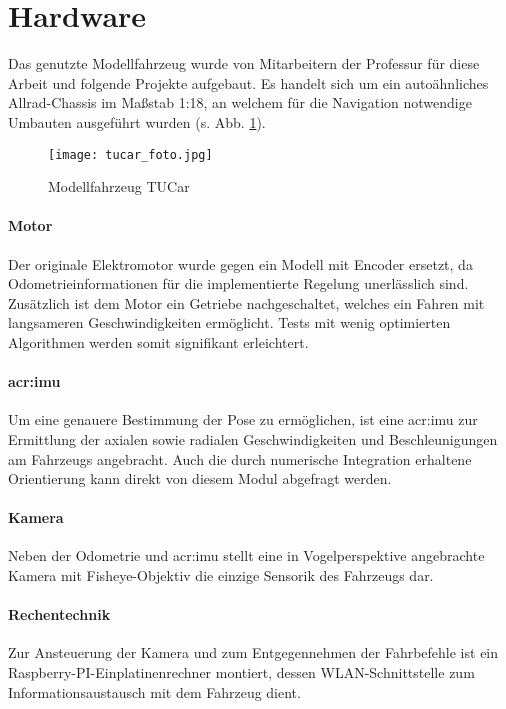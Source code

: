 \section{Hardware \dcsecondauthorshort}
Das genutzte Modellfahrzeug wurde von Mitarbeitern der Professur für diese Arbeit und folgende Projekte aufgebaut. Es handelt sich um ein autoähnliches Allrad-Chassis im Maßstab 1:18, an welchem für die Navigation notwendige Umbauten ausgeführt wurden (s. Abb. \ref{fig:tucar_foto}).
\begin{figure}[htbp] %
	\centering
	\texttt{[image: tucar\_foto.jpg]}
	\caption{Modellfahrzeug \glqq TUCar \grqq}
	\label{fig:tucar_foto}
\end{figure}
\paragraph{Motor}
Der originale Elektromotor wurde gegen ein Modell mit Encoder ersetzt, da Odometrieinformationen für die implementierte Regelung unerlässlich sind. Zusätzlich ist dem Motor ein Getriebe nachgeschaltet, welches ein Fahren mit langsameren Geschwindigkeiten ermöglicht. Tests mit wenig optimierten Algorithmen werden somit signifikant erleichtert.
\paragraph{\gls{acr:imu}}
Um eine genauere Bestimmung der Pose zu ermöglichen, ist eine \gls{acr:imu} zur Ermittlung der axialen sowie radialen Geschwindigkeiten und Beschleunigungen am Fahrzeugs angebracht. Auch die durch numerische Integration erhaltene Orientierung kann direkt von diesem Modul abgefragt werden. 
\paragraph{Kamera}
Neben der Odometrie und \gls{acr:imu} stellt eine in Vogelperspektive angebrachte Kamera mit Fisheye-Objektiv die einzige Sensorik des Fahrzeugs dar.
\paragraph{Rechentechnik}
Zur Ansteuerung der Kamera und zum Entgegennehmen der Fahrbefehle ist ein Raspberry-PI-Einplatinenrechner montiert, dessen WLAN-Schnittstelle zum Informationsaustausch mit dem Fahrzeug dient.
